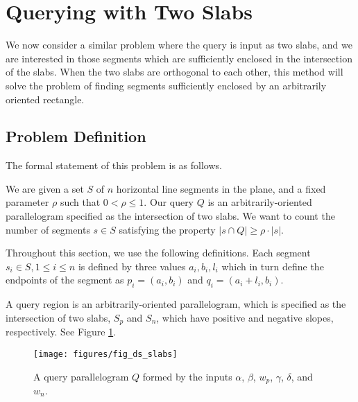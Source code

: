 \section{Querying with Two Slabs}
\label{:slabs:two}

We now consider a similar problem where the query is input as two slabs, and we are interested in those segments which are sufficiently enclosed in the intersection of the slabs.  When the two slabs are orthogonal to each other, this method will solve the problem of finding segments sufficiently enclosed by an arbitrarily oriented rectangle.



\subsection{Problem Definition}
\label{:slabs:two:problem}

The formal statement of this problem is as follows.

\begin{problem}
We are given a set $S$ of $n$ horizontal line segments in the plane, and a fixed parameter $\rho$ such that $0 < \rho \leq 1$. Our query $Q$ is an arbitrarily-oriented parallelogram specified as the intersection of two slabs. We want to count the number of segments $s \in S$  satisfying the property $|s \cap Q| \geq \rho \cdot |s|$.
\end{problem}

Throughout this section, we use the following definitions. Each segment $s_i \in S, 1 \leq i \leq n$ is defined by three values $a_i, b_i, l_i$ which in turn define the endpoints of the segment as $p_i = (a_i, b_i)$ and $q_i = (a_i + l_i, b_i)$.

A query region is an arbitrarily-oriented parallelogram, which is specified as the intersection of two slabs, $S_p$ and $S_n$, which have positive and negative slopes, respectively. See Figure \ref{fig:slabs:two:ds}.

\begin{figure}[t]
\begin{center}
  \texttt{[image: figures/fig\_ds\_slabs]}
  \caption{A query parallelogram $Q$ formed by the inputs $\alpha$, $\beta$, $w_p$,
  $\gamma$, $\delta$, and $w_n$.}
  \label{fig:slabs:two:ds}
\end{center}
\end{figure}

